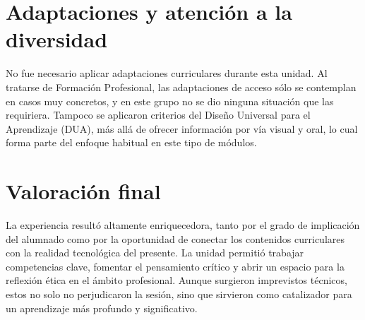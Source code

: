 \section*{Adaptaciones y atención a la diversidad}

No fue necesario aplicar adaptaciones curriculares durante esta unidad. Al tratarse de Formación Profesional, las adaptaciones de acceso sólo se contemplan en casos muy concretos, y en este grupo no se dio ninguna situación que las requiriera. Tampoco se aplicaron criterios del Diseño Universal para el Aprendizaje (DUA), más allá de ofrecer información por vía visual y oral, lo cual forma parte del enfoque habitual en este tipo de módulos.

\section*{Valoración final}

La experiencia resultó altamente enriquecedora, tanto por el grado de implicación del alumnado como por la oportunidad de conectar los contenidos curriculares con la realidad tecnológica del presente. La unidad permitió trabajar competencias clave, fomentar el pensamiento crítico y abrir un espacio para la reflexión ética en el ámbito profesional. Aunque surgieron imprevistos técnicos, estos no solo no perjudicaron la sesión, sino que sirvieron como catalizador para un aprendizaje más profundo y significativo.





